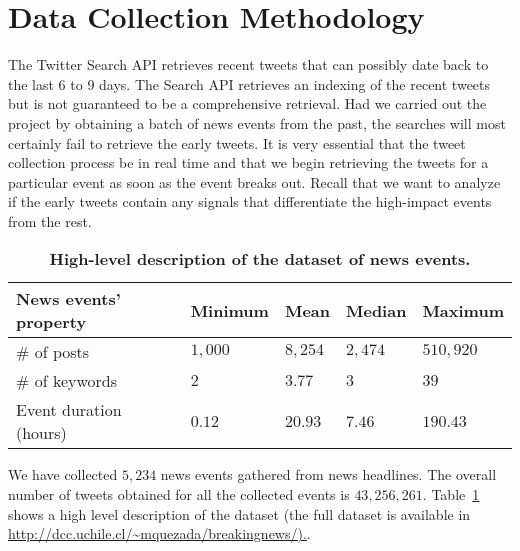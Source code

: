 \section{Data Collection Methodology}
\label{sec:data_collection_methodology}
The Twitter Search
API \cite{Twitter_API}
retrieves recent tweets that can possibly date back to the last 6
to 9 days.  The Search API retrieves an indexing of the recent tweets
but is not guaranteed to be a comprehensive retrieval. Had we
carried out the project by obtaining a batch of news events from the
past, the searches will most certainly fail to retrieve the early
tweets.  It is very essential that the tweet collection process be in real
time and that we begin retrieving the
tweets for a particular event as soon as the event breaks out.  Recall that we
want to analyze if the early tweets contain any signals that
differentiate the high-impact events from the rest. 


\begin{table}[h]
  \centering
  \begin{tabular}{@{}lllll@{}}
    \toprule
    \textbf{News events' property} & \textbf{Minimum} & \textbf{Mean} & \textbf{Median} & \textbf{Maximum} \\ \midrule
    \# of posts & $1,000$ & $8,254$ & $2,474$ & $510,920$ \\
    \# of keywords & $2$ & $3.77$ & $3$ & $39$ \\ 
    Event duration (hours) & $0.12$ & $20.93$ & $7.46$ & $190.43$ \\ \bottomrule
  \end{tabular}
  \caption{\bf High-level description of the dataset of news events.} \label{table:dataset-stats}

\end{table}

We have collected $5,234$ news events gathered from news headlines.
The overall number of tweets obtained for all the collected events is
$43,256,261$. Table~\ref{table:dataset-stats} shows a high level
description of the dataset (the full
  dataset is available in
  \url{http://dcc.uchile.cl/~mquezada/breakingnews/).}.

